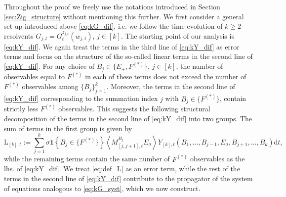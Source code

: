 \documentclass[10pt]{amsart}
\numberwithin{equation}{section}
\newcommand{\dif}{\mathrm{d}}
\newcommand{\N}{\mathbf{N}}
\begin{document}
Throughout the proof we freely use the notations introduced in Section \ref{sec:Zig_structure} without mentioning this further. We first consider a general set-up introduced above \eqref{eq:kG_dif}, i.e. we follow the time evolution of $k\ge 2$ resolvents $G_{j,t}=G^{z_{j,t}}_t(w_{j,t})$, $j\in [k]$. The starting point of our analysis is \eqref{eq:kY_dif}. We again treat the terms in the third line of \eqref{eq:kY_dif} as error terms and focus on the structure of the so-called linear terms in the second line of \eqref{eq:kY_dif}. For any choice of $B_j\in\{E_\pm, F^{(*)}\}$, $j\in [k]$, the number of observables equal to $F^{(*)}$ in each of these terms does not exceed the number of $F^{(*)}$ observables among $\{B_j\}_{j=1}^k$. Moreover, the terms in the second line of \eqref{eq:kY_dif} corresponding to the summation index $j$ with $B_j\in\{F^{(*)}\}$, contain strictly less $F^{(*)}$ observables. This suggests the following structural decomposition of the terms in the second line of \eqref{eq:kY_dif} into two groups. 
The sum of terms in the first group is given by
\begin{equation}
\mathrm{L}_{[k],t}:=\sum_{j=1}^k \sigma\mathbf{1}\left\lbrace B_j\in\{F^{(*)}\}\right\rbrace \left\langle M_{[j,j+1],t}^{B_j}E_\sigma\right\rangle Y_{[k],t}(B_1,\ldots, B_{j-1},E_\sigma, B_{j+1},\ldots, B_k)\dif t,
\label{eq:def_L}
\end{equation}
while the remaining terms contain the same number of $F^{(*)}$ observables as the lhs. of \eqref{eq:kY_dif}. We treat \eqref{eq:def_L} as an error term, while the rest of the terms in the second line of \eqref{eq:kY_dif} contribute to the propagator of the system of equations analogous to \eqref{eq:kG_syst}, which we now construct.
\end{document}
